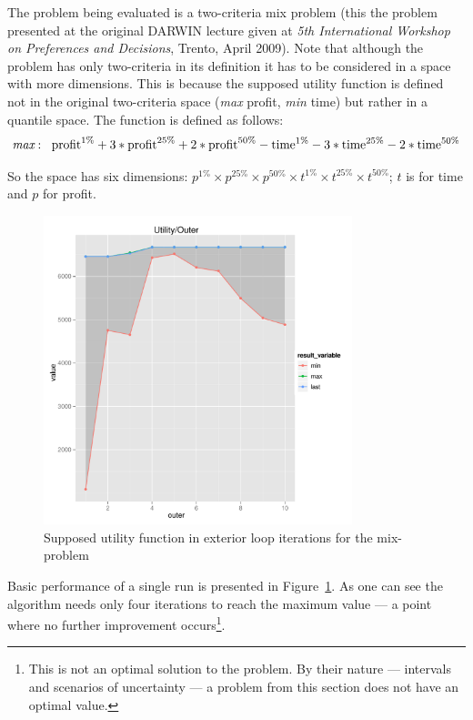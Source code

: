 The problem being evaluated is a two-criteria mix problem (this the problem
presented at the original DARWIN lecture given at \textit{5th International
  Workshop on Preferences and Decisions}, Trento, April 2009). Note that
although the problem has only two-criteria in its definition it has to be
considered in a space with more dimensions. This is because the supposed
utility function is defined not in the original two-criteria space
(\textit{max} profit, \textit{min} time) but rather in a quantile space. The
function is defined as follows:
\begin{equation*}
\textit{max}: \hspace{0.2cm} \text{profit}^{1\%} + 3 * \text{profit}^{25\%} +
2 * \text{profit}^{50\%} - \text{time}^{1\%} - 3 * \text{time}^{25\%} - 2 *
\text{time}^{50\%}
\end{equation*}

So the space has six dimensions: $p^{1\%} \times p^{25\%} \times p^{50\%}
\times t^{1\%} \times t^{25\%} \times t^{50\%}$; $t$ is for time and $p$ for
profit.

\begin{figure}
  \centering
  \includegraphics[width=0.8\textwidth]{exp/uncert/pres_utilouter}
  \caption{Supposed utility function in exterior loop iterations for the
    mix-problem}
  \label{pres_utilouter}
\end{figure}

Basic performance of a single run is presented in
Figure~\ref{pres_utilouter}. As one can see the algorithm needs only four
iterations to reach the maximum value --- a point where no further improvement
occurs\footnote{This is not an optimal solution to the problem. By their
  nature --- intervals and scenarios of uncertainty --- a problem from this
  section does not have an optimal value.}.

